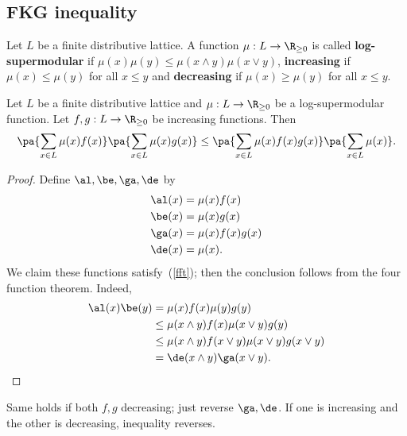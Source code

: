 \subsection{FKG inequality}
\begin{df}
Let $L$ be a finite distributive lattice. A function $\mu:L\to \R_{\ge0}$ is called \textbf{log-supermodular} if $\mu(x)\mu(y)\le \mu(x\wedge y)\mu(x\vee y)$, \textbf{increasing} if $\mu(x)\le \mu(y)$ for all $x\le y$ and \textbf{decreasing} if $\mu(x)\ge \mu(y)$ for all $x\le y$.
\end{df}
\begin{thm}
Let $L$ be a finite distributive lattice and $\mu:L\to \R_{\ge 0}$ %
be a log-supermodular function. Let $f,g:L\to\R_{\ge 0}$ be increasing functions. Then
\[
\pa{\sum_{x\in L} \mu(x)f(x)}
\pa{\sum_{x\in L} \mu(x)g(x)}
\le
\pa{\sum_{x\in L} \mu(x)f(x)g(x)}
\pa{\sum_{x\in L} \mu(x)}.
\]
\end{thm}
\begin{proof}

Define $\al,\be,\ga,\de$ by
\begin{align*}
\al(x)&=\mu(x)f(x)\\
\be(x)&=\mu(x)g(x)\\
\ga(x)&=\mu(x)f(x)g(x)\\
\de(x)&=\mu(x).
\end{align*}
We claim these functions satisfy~(\ref{fft}); then the conclusion follows from the four function theorem. %
Indeed,
\begin{align*}
\al(x)\be(y)&=\mu(x)f(x)\mu(y)g(y)\\
&\le \mu(x\wedge y)f(x)\mu(x\vee y)g(y)\\
&\le \mu(x\wedge y) f(x\vee y)\mu(x\vee y)g(x\vee y)\\
&=\de(x\wedge y)\ga(x\vee y).
\end{align*}
\end{proof}
Same holds if both $f,g$ decreasing; just reverse $\ga,\de$. If one is increasing and the other is decreasing, inequality reverses.

